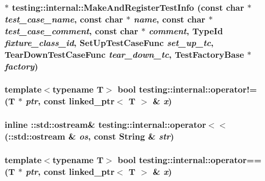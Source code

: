 \subsubsection{$\ast$ testing::internal::MakeAndRegisterTestInfo (const char $\ast$ {\em test\_\-case\_\-name}, const char $\ast$ {\em name}, const char $\ast$ {\em test\_\-case\_\-comment}, const char $\ast$ {\em comment}, TypeId {\em fixture\_\-class\_\-id}, SetUpTestCaseFunc {\em set\_\-up\_\-tc}, TearDownTestCaseFunc {\em tear\_\-down\_\-tc}, TestFactoryBase $\ast$ {\em factory})}\label{namespacetesting_1_1internal_c8a4baccf925ac1c597b5bf7956d680e}


\subsubsection{\setlength{\rightskip}{0pt plus 5cm}template$<$typename T$>$ bool testing::internal::operator!= (T $\ast$ {\em ptr}, const linked\_\-ptr$<$ T $>$ \& {\em x})\hspace{0.3cm}{\tt  [inline]}}\label{namespacetesting_1_1internal_baa4d7e27908d4cbdfaad4c0839ca048}


\subsubsection{\setlength{\rightskip}{0pt plus 5cm}inline ::std::ostream\& testing::internal::operator$<$$<$ (::std::ostream \& {\em os}, const String \& {\em str})}\label{namespacetesting_1_1internal_85854cbfc0ec814a25a8d25aa31dea04}


\subsubsection{\setlength{\rightskip}{0pt plus 5cm}template$<$typename T$>$ bool testing::internal::operator== (T $\ast$ {\em ptr}, const linked\_\-ptr$<$ T $>$ \& {\em x})\hspace{0.3cm}{\tt  [inline]}}\label{namespacetesting_1_1internal_b82bd34321b3c32eb3631eda982c17d4}


